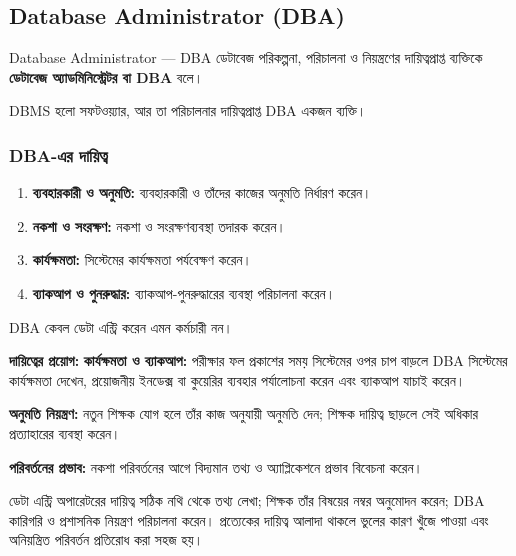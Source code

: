 \subsection{Database Administrator (DBA)}
\begin{definitionbox}{Database Administrator — DBA}
ডেটাবেজ পরিকল্পনা, পরিচালনা ও নিয়ন্ত্রণের দায়িত্বপ্রাপ্ত ব্যক্তিকে \textbf{ডেটাবেজ অ্যাডমিনিস্ট্রেটর বা DBA} বলে।
\end{definitionbox}
DBMS হলো সফটওয়্যার, আর তা পরিচালনার দায়িত্বপ্রাপ্ত DBA একজন ব্যক্তি।


\subsubsection{DBA-এর দায়িত্ব}
\begin{enumerate}
\item \textbf{ব্যবহারকারী ও অনুমতি:} ব্যবহারকারী ও তাঁদের কাজের অনুমতি নির্ধারণ করেন।
\item \textbf{নকশা ও সংরক্ষণ:} নকশা ও সংরক্ষণব্যবস্থা তদারক করেন।
\item \textbf{কার্যক্ষমতা:} সিস্টেমের কার্যক্ষমতা পর্যবেক্ষণ করেন।
\item \textbf{ব্যাকআপ ও পুনরুদ্ধার:} ব্যাকআপ-পুনরুদ্ধারের ব্যবস্থা পরিচালনা করেন।
\end{enumerate}
DBA কেবল ডেটা এন্ট্রি করেন এমন কর্মচারী নন।

\textbf{দায়িত্বের প্রয়োগ:}
\textbf{কার্যক্ষমতা ও ব্যাকআপ:} পরীক্ষার ফল প্রকাশের সময় সিস্টেমের ওপর চাপ বাড়লে DBA সিস্টেমের কার্যক্ষমতা দেখেন, প্রয়োজনীয় ইনডেক্স বা কুয়েরির ব্যবহার পর্যালোচনা করেন এবং ব্যাকআপ যাচাই করেন।

\textbf{অনুমতি নিয়ন্ত্রণ:} নতুন শিক্ষক যোগ হলে তাঁর কাজ অনুযায়ী অনুমতি দেন; শিক্ষক দায়িত্ব ছাড়লে সেই অধিকার প্রত্যাহারের ব্যবস্থা করেন।

\textbf{পরিবর্তনের প্রভাব:} নকশা পরিবর্তনের আগে বিদ্যমান তথ্য ও অ্যাপ্লিকেশনে প্রভাব বিবেচনা করেন।

ডেটা এন্ট্রি অপারেটরের দায়িত্ব সঠিক নথি থেকে তথ্য লেখা; শিক্ষক তাঁর বিষয়ের নম্বর অনুমোদন করেন; DBA কারিগরি ও প্রশাসনিক নিয়ন্ত্রণ পরিচালনা করেন। প্রত্যেকের দায়িত্ব আলাদা থাকলে ভুলের কারণ খুঁজে পাওয়া এবং অনিয়ন্ত্রিত পরিবর্তন প্রতিরোধ করা সহজ হয়।

